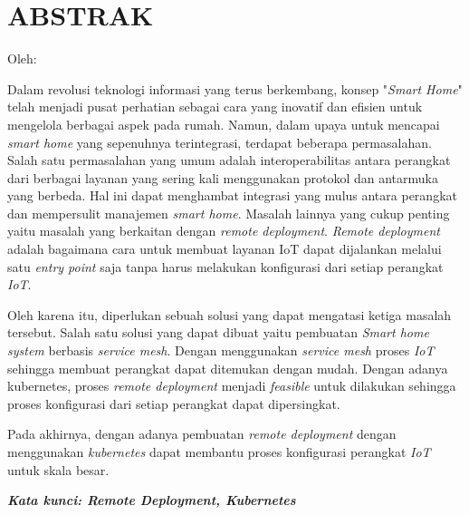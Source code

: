 \clearpage
\chapter*{ABSTRAK}
\begin{center}
  \center
  \begin{singlespace}
    \large\bfseries\MakeUppercase{\thetitle}
    
    \normalfont\normalsize
    Oleh:
    
    \bfseries \theauthor
  \end{singlespace}
\end{center}

\begin{singlespace}
  \small
  Dalam revolusi teknologi informasi yang terus berkembang, konsep "\textit{Smart Home}" telah menjadi pusat perhatian sebagai cara yang inovatif dan efisien untuk mengelola berbagai aspek pada rumah. Namun, dalam upaya untuk mencapai \textit{smart home} yang sepenuhnya terintegrasi, terdapat beberapa permasalahan. Salah satu permasalahan yang umum adalah interoperabilitas antara perangkat dari berbagai layanan yang sering kali menggunakan protokol dan antarmuka yang berbeda. Hal ini dapat menghambat integrasi yang mulus antara perangkat dan mempersulit manajemen \textit{smart home}. Masalah lainnya yang cukup penting yaitu masalah yang berkaitan dengan \textit{remote deployment}. \textit{Remote deployment} adalah bagaimana cara untuk membuat layanan IoT dapat dijalankan melalui satu \textit{entry point} saja tanpa harus melakukan konfigurasi dari setiap perangkat \textit{IoT}. 
  
  Oleh karena itu, diperlukan sebuah solusi yang dapat mengatasi ketiga masalah tersebut. Salah satu solusi yang dapat dibuat yaitu pembuatan \textit{Smart home system} berbasis \textit{service mesh}. Dengan menggunakan \textit{service mesh} proses \textit{IoT} sehingga membuat perangkat dapat ditemukan dengan mudah. Dengan adanya kubernetes, proses \textit{remote deployment} menjadi \textit{feasible} untuk dilakukan sehingga proses konfigurasi dari setiap perangkat dapat dipersingkat.
  
  Pada akhirnya, dengan adanya pembuatan \textit{remote deployment} dengan menggunakan \textit{kubernetes} dapat membantu proses konfigurasi perangkat \textit{IoT} untuk skala besar.
  
  \textbf{\textit{Kata kunci: Remote Deployment, Kubernetes }}
  
\end{singlespace}
\clearpage
